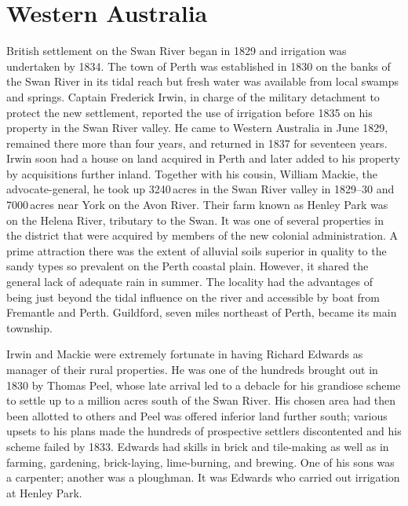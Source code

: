 \section*{Western Australia}

British settlement on the Swan River began in 1829
and irrigation was undertaken by 1834.  The town of Perth was established in 1830 on the banks of the Swan River in its
tidal reach but fresh water was available from local swamps and
springs.  Captain Frederick Irwin, in charge of the
military detachment to protect the new settlement, reported the use of
irrigation before 1835 on his property in the Swan River valley.  He
came to Western Australia in June 1829, remained there more than four
years, and returned in 1837 for seventeen years.  Irwin soon had a
house on land acquired in Perth and later added to his property by
acquisitions further inland.  Together with his cousin, William
Mackie, the advocate-general, he took up 3240\,acres
in the Swan River valley in 1829--30 and 7000\,acres near York on the
Avon River. Their farm known as Henley
Park was on the Helena
River, tributary to the Swan.  It was one of
several properties in the district that were acquired by members of
the new colonial administration.  A prime attraction there was the
extent of alluvial soils superior in quality to the sandy types so
prevalent on the Perth coastal plain.  However, it shared the general
lack of adequate rain in summer.  The locality had the advantages of
being just beyond the tidal influence on the river and accessible by
boat from Fremantle
 and Perth.  Guildford, seven miles
northeast of Perth, became its main
township.

Irwin and Mackie were extremely fortunate in having Richard
Edwards as manager of their rural properties.  He
was one of the hundreds brought out in 1830 by Thomas
Peel, whose late arrival led to a debacle for his
grandiose scheme to settle up to a million acres south of the Swan
River.  His chosen area had then been allotted to others and Peel was
offered inferior land further south; various upsets to his plans made
the hundreds of prospective settlers discontented and his scheme
failed by 1833.  Edwards had skills in brick and tile-making as well
as in farming, gardening, brick-laying, lime-burning,
and brewing.  One of his sons was a carpenter; another was a
ploughman.  It was Edwards who carried out irrigation at Henley Park.

